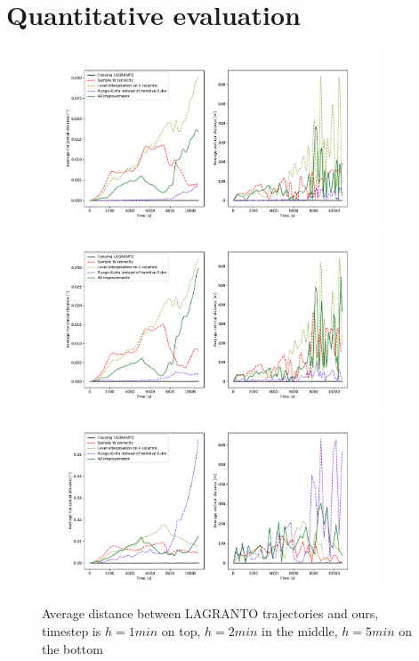 



\section{Quantitative evaluation}\label{sec:quality}

\begin{figure}
\centering \includegraphics*[width=0.9\textwidth]{figures/plot_dt1}
\label{fig:plot_dt1}
\centering \includegraphics*[width=0.9\textwidth]{figures/plot_dt2}
\label{fig:plot_dt2}
\centering \includegraphics*[width=0.9\textwidth]{figures/plot_dt5}
\caption{Average distance between LAGRANTO trajectories and ours, timestep is $h = 1 min$ on top, $h = 2 min$ in the middle, $h = 5 min$ on the bottom}
\label{fig:plot_dt5}
\end{figure}

